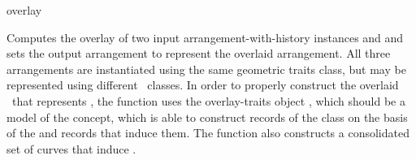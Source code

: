 
\ccRefPageBegin

\begin{ccRefFunction}{overlay}



   {Computes the overlay of two input arrangement-with-history instances
     and  and sets the output arrangement 
    to represent the overlaid arrangement. All three arrangements are
    instantiated using the same geometric traits class, but may be represented
    using different \dcel\ classes. In order to properly construct the
    overlaid \dcel\ that represents , the function uses the
    overlay-traits object , which should be a model of the
     concept, which is able to construct records of the
     class on the basis of the  and 
    records that induce them. The function also constructs a consolidated set
    of curves that induce .}

\ccSeeAlso

\end{ccRefFunction}

\ccRefPageEnd
